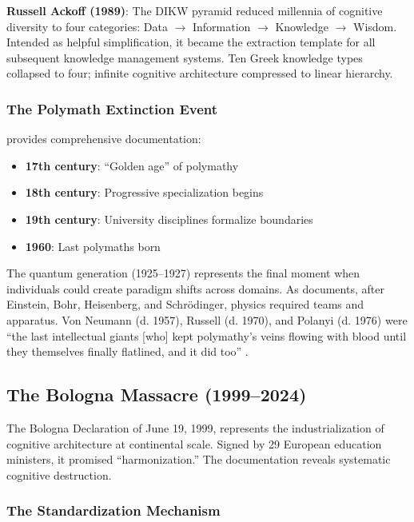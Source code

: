 \textbf{Russell Ackoff (1989)}: The DIKW pyramid \citep{ackoff1989} reduced millennia of cognitive diversity to four categories: Data $\rightarrow$ Information $\rightarrow$ Knowledge $\rightarrow$ Wisdom. Intended as helpful simplification, it became the extraction template for all subsequent knowledge management systems. Ten Greek knowledge types collapsed to four; infinite cognitive architecture compressed to linear hierarchy.

\subsubsection{The Polymath Extinction Event}

\citet{burke2020} provides comprehensive documentation:

\begin{itemize}
    \item \textbf{17th century}: ``Golden age'' of polymathy
    \item \textbf{18th century}: Progressive specialization begins
    \item \textbf{19th century}: University disciplines formalize boundaries
    \item \textbf{1960}: Last polymaths born
\end{itemize}

The quantum generation (1925--1927) represents the final moment when individuals could create paradigm shifts across domains. As \citet{beller1996} documents, after Einstein, Bohr, Heisenberg, and Schrödinger, physics required teams and apparatus. Von Neumann (d. 1957), Russell (d. 1970), and Polanyi (d. 1976) were ``the last intellectual giants [who] kept polymathy's veins flowing with blood until they themselves finally flatlined, and it did too'' \citep{hoel2025}.

\subsection{The Bologna Massacre (1999--2024)}

The Bologna Declaration of June 19, 1999, represents the industrialization of cognitive architecture at continental scale. Signed by 29 European education ministers, it promised ``harmonization.'' The documentation reveals systematic cognitive destruction.

\subsubsection{The Standardization Mechanism}


